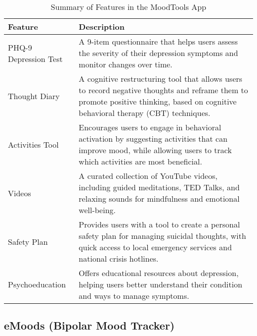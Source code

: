 \FloatBarrier
\begin{table}[ht]
\centering
\begin{tabular}{|p{4cm}|p{10cm}|}
\hline
\textbf{Feature} & \textbf{Description} \\ \hline
PHQ-9 Depression Test & A 9-item questionnaire that helps users assess the severity of their depression symptoms and monitor changes over time. \\ \hline
Thought Diary & A cognitive restructuring tool that allows users to record negative thoughts and reframe them to promote positive thinking, based on cognitive behavioral therapy (CBT) techniques. \\ \hline
Activities Tool & Encourages users to engage in behavioral activation by suggesting activities that can improve mood, while allowing users to track which activities are most beneficial. \\ \hline
Videos & A curated collection of YouTube videos, including guided meditations, TED Talks, and relaxing sounds for mindfulness and emotional well-being. \\ \hline
Safety Plan & Provides users with a tool to create a personal safety plan for managing suicidal thoughts, with quick access to local emergency services and national crisis hotlines. \\ \hline
Psychoeducation & Offers educational resources about depression, helping users better understand their condition and ways to manage symptoms. \\ \hline
\end{tabular}
\caption{Summary of Features in the MoodTools App}
\label{tab:moodtools_features}
\end{table}
\FloatBarrier

\subsection{eMoods (Bipolar Mood Tracker)}

